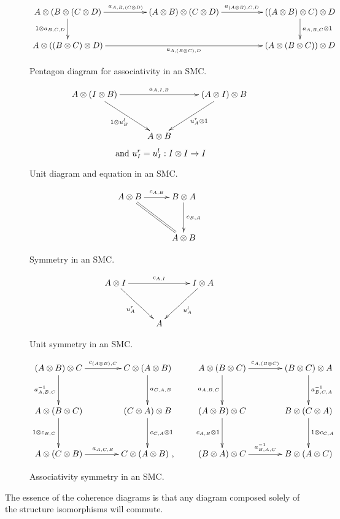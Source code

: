\begin{figure}[!htbp]
\[
  \xymatrix@C+25pt{
    A\*(B\*(C\*D) \ar[r]^{a_{A,B,(C\*D)}} \ar[d]_{1\*a_{B,C,D}}
      & (A\*B)\*(C\*D) \ar[r]^{a_{(A\*B),C,D}}
      & ((A\*B)\*C)\*D \ar[d]^{a_{A,B,C}\*1}\\
    A\*((B\*C)\*D) \ar[rr]_{a_{A,(B\*C),D}}
      && (A\*(B\*C))\*D
  }
\]
\caption{Pentagon diagram for associativity in an SMC.}\label{fig:SMC_pentagon}
\end{figure}
\begin{figure}[!htbp]
\[
  \xymatrix@C+5pt@R+10pt{
    A\*(I\*B) \ar[rr]^{a_{A,I,B}} \ar[dr]_{1\*u^l_B}
      && (A\*I)\*B \ar[dl]^{u^r_A \* 1}\\
      &A\*B
  }
\]
\[\text{ and } u^r_I = u^l_I: I\otimes I \to I\]
\caption{Unit diagram and equation in an SMC.}\label{fig:SMC_unit}
\end{figure}
\begin{figure}[!htbp]
\[
  \xymatrix@C+5pt@R+10pt{
    A\*B \ar[r]^{c_{A,B}} \ar@{=}[dr]
      & B\*A \ar[d]^{c_{B,A}}\\
      &A\*B
  }
\]
\caption{Symmetry in an SMC.}\label{fig:SMC_commutes}
\end{figure}
\begin{figure}[!htbp]
\[
  \xymatrix@C+5pt@R+10pt{
    A\*I \ar[rr]^{c_{A,I}} \ar[dr]_{u^r_A}
      && I\*A \ar[dl]^{u^l_A}\\
      &A
  }
\]
\caption{Unit symmetry in an SMC.}\label{fig:SMC_unit_symmettry}
\end{figure}
\begin{figure}[!htbp]
\[
  \xymatrix@C+15pt@R+10pt{
    (A\*B)\*C \ar[r]^{c_{(A\*B),C}} \ar[d]_{a^{-1}_{A,B,C}}
      & C\*(A\*B) \ar[d]^{a_{C,A,B}}\\
    A\*(B\*C) \ar[d]_{1\*c_{B,C}}
      & (C\*A)\*B \ar[d]^{c_{C,A}\*1}\\
    A\*(C\*B) \ar[r]^{a_{A,C,B}}
      & C\*(A\*B)\text{ ,}
  }\qquad
  \xymatrix@C+15pt@R+10pt{
    A\*(B\*C) \ar[r]^{c_{A,(B\*C)}} \ar[d]_{a_{A,B,C}}
      & (B\*C)\*A \ar[d]^{a^{-1}_{B,C,A}}\\
    (A\*B)\*C \ar[d]_{c_{A,B}\*1}
      & B\*(C\*A) \ar[d]^{1\*c_{C,A}}\\
    (B\*A)\*C \ar[r]^{a^{-1}_{B,A,C}}
      & B\*(A\*C)
  }
\]
\caption{Associativity symmetry in an SMC.}\label{fig:SMC_associativity_symmetry}
\end{figure}
The essence of the coherence diagrams is that any diagram composed solely of the structure
isomorphisms will commute.


